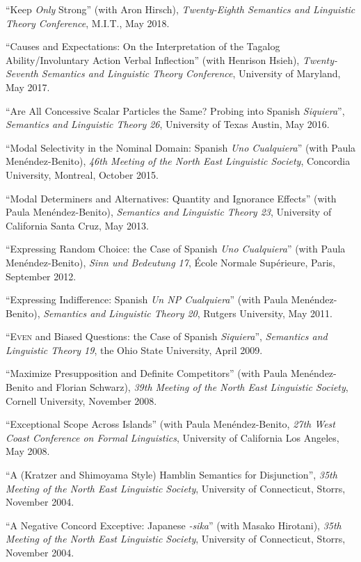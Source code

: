 \documentclass[11pt]{article}
\begin{document}
``Keep \textit{Only} Strong'' (with Aron Hirsch), \textit{Twenty-Eighth Semantics and Linguistic Theory Conference}, M.I.T., May 2018. 

``Causes and Expectations: On the Interpretation of the Tagalog Ability/Involuntary Action Verbal Inflection'' (with Henrison Hsieh), \textit{Twenty-Seventh Semantics and Linguistic Theory Conference}, University of Maryland, May 2017. 


``Are All Concessive Scalar Particles the Same? Probing into Spanish \textit{Siquiera}'', \textit{Semantics and Linguistic Theory 26}, University of Texas Austin, May 2016. 

``Modal Selectivity in the Nominal Domain: Spanish \textit{Uno Cualquiera}'' (with Paula Men\'endez-Benito), \textit{46th Meeting of the North East Linguistic Society}, Concordia University, Montreal, October 2015. 

``Modal Determiners and Alternatives: Quantity and Ignorance
Effects'' (with Paula Men\'endez-Benito), \textit{Semantics and
  Linguistic Theory 23}, University of California Santa Cruz, May 2013. 

``Expressing Random
Choice: the Case of Spanish \textit{Uno Cualquiera}''  (with Paula Men\'endez-Benito), \textit{Sinn
  und Bedeutung 17}, \'{E}cole Normale Sup\'{e}rieure, Paris, September 2012.

``Expressing Indifference: Spanish \textit{Un NP
  Cualquiera}'' (with Paula Men\'endez-Benito), \textit{Semantics and
Linguistic Theory 20}, Rutgers University, May 2011. 

``\textsc{Even} and Biased Questions: the Case of Spanish \textit{Siquiera}'', \textit{Semantics and Linguistic Theory 19}, the Ohio State University, April 2009. 

``Maximize Presupposition and Definite Competitors'' (with
  Paula Men\'endez-Benito and Florian Schwarz), \textit{39th
  Meeting of the North East Linguistic Society}, Cornell University, November 2008. 


``Exceptional Scope Across Islands'' (with Paula Men\'endez-Benito, \textit{27th West Coast Conference on
  Formal Linguistics}, University of California Los Angeles, May 2008. 


``A (Kratzer and Shimoyama Style) Hamblin Semantics for Disjunction'', \textit{35th
  Meeting of the North East Linguistic Society}, University of Connecticut, Storrs, November 2004. 


``A Negative Concord Exceptive: Japanese \textit{-sika}'' (with Masako Hirotani), \textit{35th
  Meeting of the North East Linguistic Society}, University of Connecticut, Storrs, November 2004. 
\end{document}
